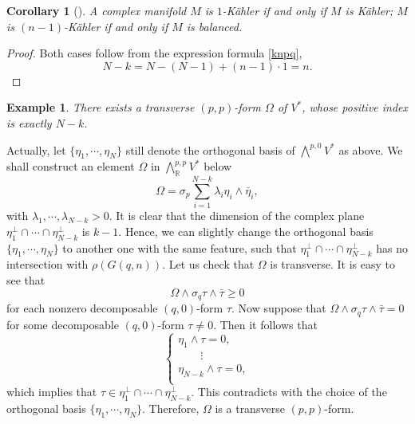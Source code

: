 \documentclass[12pt]{amsart}
\numberwithin{equation}{section}
\newtheorem{corollary}  [theorem]     {Corollary}
\newtheorem{example}  [theorem]     {Example}
\renewcommand{\1}{\mathds{1}}
\renewcommand{\>}{\rightarrow}
\begin{document}
\begin{corollary}[{\cite[Proposition 1.15]{aa}}]\label{}
A complex manifold $M$ is $1$-K\"ahler if and only if $M$ is
K\"ahler; $M$ is $(n-1)$-K\"ahler if and only if $M$ is balanced.
\end{corollary}
\begin{proof}
Both cases follow from the expression formula \eqref{knpq},
$$N-k=N-(N-1)+(n-1)\cdot 1=n. $$
\end{proof}


\begin{example}
There exists a transverse $(p,p)$-form $\Omega$ of $V^*$, whose positive
index is exactly $N-k$.
\end{example}
Actually, let $\{\eta_1,\cdots,\eta_N\}$ still denote the orthogonal
basis of $\bigwedge^{p,0}V^*$ as above. We shall construct an
element $\Omega$ in $\bigwedge^{p,p}_{\mathbb{R}}V^*$ below
\[ \Omega= \sigma_p \sum_{i=1}^{N-k} \lambda_i\eta_i\wedge\bar\eta_i, \]
with $\lambda_1,\cdots,\lambda_{N-k}>0$. It is clear that the
dimension of the complex plane
$\eta_1^\perp\cap\cdots\cap\eta_{N-k}^\perp$ is $k-1$. Hence, we can
slightly change the orthogonal basis $\{\eta_1,\cdots,\eta_N\}$ to
another one with the same feature, such that
$\eta_1^\perp\cap\cdots\cap\eta_{N-k}^\perp$ has no intersection
with $\rho(G(q,n))$. Let us check that $\Omega$ is transverse. It is
easy to see that
$$\Omega\wedge\sigma_{q}\tau\wedge\bar\tau\geq 0$$
for each nonzero decomposable $(q,0)$-form $\tau$. Now suppose that
$\Omega\wedge\sigma_{q}\tau\wedge\bar\tau=0$ for some decomposable
$(q,0)$-form $\tau\neq0$. Then it follows that
$$
    \begin{cases}
     \eta_1\wedge\tau=0,\\
     \qquad\vdots\\
     \eta_{N-k}\wedge\tau=0,\\
    \end{cases}
$$
which implies that
$\tau\in\eta_1^\perp\cap\cdots\cap\eta_{N-k}^\perp$. This
contradicts with the choice of the orthogonal basis
$\{\eta_1,\cdots,\eta_N\}$. Therefore, $\Omega$ is a transverse
$(p,p)$-form.
\end{document}
